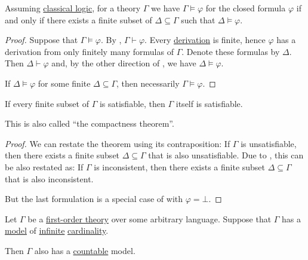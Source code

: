 \begin{theorem}\label{thm:first_order_compactness_theorem}
  Assuming \hyperref[def:classical_logic]{classical logic}, for a theory \( \Gamma \) we have \( \Gamma \vDash \varphi \) for the closed formula \( \varphi \) if and only if there exists a finite subset of \( \Delta \subseteq \Gamma \) such that \( \Delta \vDash \varphi \).
\end{theorem}
\begin{proof}
  \SufficiencySubProof Suppose that \( \Gamma \vDash \varphi \).  By , \( \Gamma \vdash \varphi \). Every \hyperref[def:derivation_system_derivability]{derivation} is finite, hence \( \varphi \) has a derivation from only finitely many formulas of \( \Gamma \). Denote these formulas by \( \Delta \). Then \( \Delta \vdash \varphi \) and, by the other direction of , we have \( \Delta \vDash \varphi \).

  \NecessitySubProof If \( \Delta \vDash \varphi \) for some finite \( \Delta \subseteq \Gamma \), then necessarily \( \Gamma \vDash \varphi \).
\end{proof}

\begin{corollary}\label{thm:first_order_compactness_theorem_satisfiability}
  If every finite subset of \( \Gamma \) is satisfiable, then \( \Gamma \) itself is satisfiable.

  This is also called \enquote{the compactness theorem}.
\end{corollary}
\begin{proof}
  We can restate the theorem using its contraposition: If \( \Gamma \) is unsatisfiable, then there exists a finite subset \( \Delta \subseteq \Gamma \) that is also unsatisfiable. Due to , this can be also restated as: If \( \Gamma \) is inconsistent, then there exists a finite subset \( \Delta \subseteq \Gamma \) that is also inconsistent.

  But the last formulation is a special case of  with \( \varphi = \bot \).
\end{proof}

\begin{theorem}\label{thm:downward_lowenheim_skolem_theorem}
  Let \( \Gamma \) be a \hyperref[def:first_order_theory]{first-order theory} over some arbitrary language. Suppose that \( \Gamma \) has a \hyperref[def:first_order_semantics/satisfiability]{model} of \hyperref[def:set_finiteness]{infinite} \hyperref[thm:cardinality_existence]{cardinality}.

  Then \( \Gamma \) also has a \hyperref[def:set_countablility]{countable} model.
\end{theorem}

